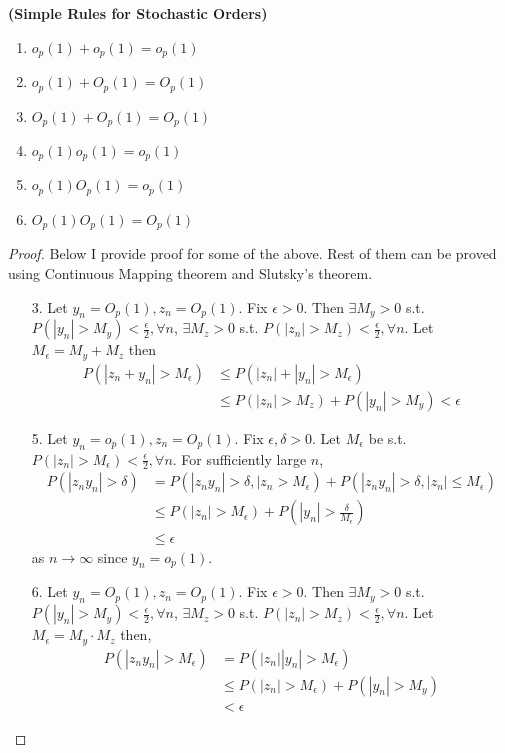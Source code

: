 \documentclass[11pt]{article} %
\theoremstyle{definition}
\numberwithin{defn}{subsection}
\numberwithin{thm}{subsection}
\numberwithin{ex}{subsection}
\newcommand{\ninfty}{n\rightarrow\infty}
\begin{document}
\begin{thm}
	\textbf{(Simple Rules for Stochastic Orders)}
	\begin{enumerate}
		\item $o_p(1)+o_p(1)=o_p(1)$
		\item $o_p(1)+O_p(1)=O_p(1)$
		\item $O_p(1)+O_p(1)=O_p(1)$
		\item $o_p(1)o_p(1)=o_p(1)$
		\item $o_p(1)O_p(1)=o_p(1)$
		\item $O_p(1)O_p(1)=O_p(1)$
	\end{enumerate}
	\begin{proof}\leavevmode
		Below I provide proof for some of the above. Rest of them can be proved using Continuous Mapping theorem and Slutsky's theorem.
		\begin{itemize}
			\item[3.] Let $y_n=O_p(1),z_n=O_p(1).$ Fix $\epsilon>0$. Then $\exists M_y>0$ s.t. $P(|y_n|>M_y)<\frac{\epsilon}{2},\forall n$, $\exists M_z>0$ s.t. $P(|z_n|>M_z)<\frac{\epsilon}{2},\forall n$. Let $M_{\epsilon}=M_y+M_z$ then
			\begin{align*}
			P(|z_n+y_n|>M_{\epsilon})&\le P(|z_n|+|y_n|>M_{\epsilon})\\
			&\le P(|z_n|>M_z)+P(|y_n|>M_y)<\epsilon
			\end{align*}
			
			\item[5.] Let $y_n=o_p(1),z_n=O_p(1).$ Fix $\epsilon,\delta>0$. Let $M_{\epsilon}$ be s.t. $P(|z_n|>M_{\epsilon})<\frac{\epsilon}{2},\forall n$. For sufficiently large $n$,
			\begin{align*}
			P(|z_ny_n|>\delta)&=P(|z_ny_n|>\delta,|z_n>M_{\epsilon})+P(|z_ny_n|>\delta,|z_n|\le M_{\epsilon})\\
			&\le P(|z_n|>M_{\epsilon})+P(|y_n|>\frac{\delta}{M_{\epsilon}})\\
			&\le \epsilon
			\end{align*}
			as $\ninfty$ since $y_n=o_p(1)$.
			
			\item[6.] Let $y_n=O_p(1),z_n=O_p(1).$ Fix $\epsilon>0$. Then $\exists M_y>0$ s.t. $P(|y_n|>M_y)<\frac{\epsilon}{2},\forall n$, $\exists M_z>0$ s.t. $P(|z_n|>M_z)<\frac{\epsilon}{2},\forall n$. Let $M_{\epsilon}=M_y\cdot M_z$ then,
			\begin{align*}
			P(|z_ny_n|>M_{\epsilon})&=P(|z_n||y_n|>M_{\epsilon})\\
			&\le P(|z_n|>M_{\epsilon})+P(|y_n|>M_y)\\
			&<\epsilon
			\end{align*}
		\end{itemize}
	\end{proof}
\end{thm}
\end{document}
